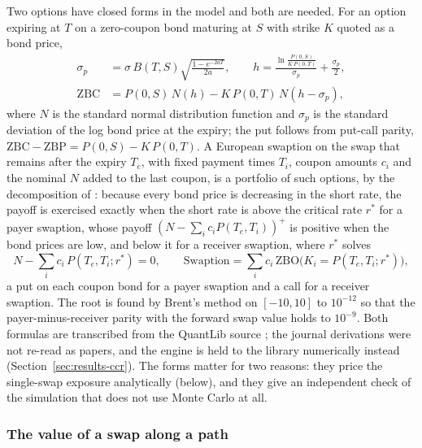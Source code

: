Two options have closed forms in the model and both are needed. For an option expiring at $T$ on a zero-coupon bond maturing at $S$ with strike $K$ quoted as a bond price,
\begin{equation}
\begin{aligned}
\sigma_p&=\sigma\,B(T,S)\sqrt{\frac{1-e^{-2aT}}{2a}},\qquad h=\frac{\ln\frac{P(0,S)}{K\,P(0,T)}}{\sigma_p}+\frac{\sigma_p}{2},\\
\mathrm{ZBC}&=P(0,S)\,N(h)-K\,P(0,T)\,N(h-\sigma_p),
\end{aligned}
\label{eq:ccr-zbo}
\end{equation}
where $N$ is the standard normal distribution function and $\sigma_p$ is the standard deviation of the log bond price at the expiry; the put follows from put-call parity,
$\mathrm{ZBC}-\mathrm{ZBP}=P(0,S)-K\,P(0,T)$. A European swaption on the swap that remains after the expiry $T_e$, with fixed payment times $T_i$, coupon amounts $c_i$ and the nominal $N$ added to
the last coupon, is a portfolio of such options, by the decomposition of \citet{ccr:jamshidian1989}: because every bond price is decreasing in the short rate, the payoff is exercised
exactly when the short rate is above the critical rate $r^\ast$ for a payer swaption, whose payoff $(N-\sum_ic_iP(T_e,T_i))^+$ is positive when the bond prices are low,
and below it for a receiver swaption, where $r^\ast$ solves
\begin{equation}
N-\sum_i c_i\,P(T_e,T_i;r^\ast)=0,\qquad \text{Swaption}=\sum_i c_i\,\mathrm{ZBO}\big(K_i=P(T_e,T_i;r^\ast)\big),
\label{eq:ccr-jam}
\end{equation}
a put on each coupon bond for a payer swaption and a call for a receiver swaption. The root is found by Brent's method on $[-10,10]$ to $10^{-12}$ so that the payer-minus-receiver parity
with the forward swap value holds to $10^{-9}$. Both formulas are transcribed from the QuantLib source \citep{ccr:quantlib}; the journal derivations were not re-read as papers, and the engine is
held to the library numerically instead (Section~\ref{sec:results-ccr}). The forms matter for two reasons: they price the single-swap exposure analytically (below), and they give an
independent check of the simulation that does not use Monte Carlo at all.

\subsubsection{The value of a swap along a path}


